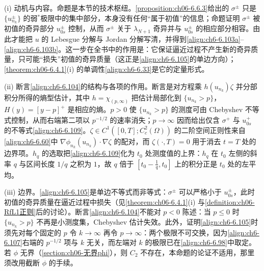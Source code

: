 \documentclass[../../main.tex]{subfiles}%
\begin{document}
\begin{remark}\label{remark:ch06-6.6.5}
(i) 动机与内容。命题是本节的技术枢纽。\cref{proposition:ch06-6.6.3}给出的 $\sigma^\pm$ 只是 $\{u^\pm_{n_k}\}$ 的弱$^*$极限中的集中部分，本身没有任何“属于初值”的信息；命题证明 $\sigma^\pm$ 被初值的奇异部分 $u^\pm_{0s}$ 控制，从而 $\sigma^\pm$ 关于 $\lambda_{N+1}$ 奇异并与 $u^\pm_{0s}$ 的相应部分相容。由此才能把 $u$ 的 Lebesgue 分解与 Jordan 分解写清，并得到\eqref{align:ch6-6.103a}--\eqref{align:ch6-6.103b}。这一步在全书中的作用是：它保证逼近过程不产生新的奇异质量，只可能“损失”初值的奇异质量（这正是\eqref{align:ch6-6.105}的单边方向）；\cref{theorem:ch06-6.4.1}(i) 的单调性\eqref{align:ch6-6.33}是它的定量形式。

(ii) 断言\eqref{align:ch6-6.104}的结构与各项的作用。断言是对方程乘 $h(u_{n_k})\zeta$ 并分部积分所得的熵型估计，其中 $h=\chi_{(p,\infty)}$ 把估计局部化到 $\{u_{n_k}>p\}$，$H(y)=[y-p]^+$ 是相应的熵。$p>0$ 使 $\{u_{n_k}>p\}$ 的测度可由 Chebyshev 不等式控制，从而右端第二项以 $p^{-1/2}$ 的速率消失；$p\to\infty$ 因而给出仅含 $\sigma^+$ 与 $u^+_{0s}$ 的不等式\eqref{align:ch6-6.109}。$\zeta\in C^1([0,T];C^2_c(\Omega))$ 的二阶空间正则性来自\eqref{align:ch6-6.60}中 $\nabla\phi_{n_k}(u_{n_k})\cdot\nabla\zeta$ 的配对，而 $\zeta(\cdot,T)=0$ 用于消去 $t=T$ 处的边界项。$h_q$ 的选取把\eqref{align:ch6-6.109}化为 $t_0$ 处测度值的上界：$h_q$ 在 $t_0$ 左侧的斜率 $q$ 与区间长度 $1/q$ 之积为 $1$，故 $q$ 倍于 $[t_0-\frac{1}{q},t_0]$ 上的积分正是 $t_0$ 处的左平均。

(iii) 边界。\eqref{align:ch6-6.105}是单边不等式而非等式：$\sigma^\pm$ 可以严格小于 $u^\pm_{0s}$，此时初值的奇异质量在逼近过程中损失（见\cref{theorem:ch06-6.4.1}(i) 与\cref{definition:ch06-RfL1正则}后的讨论）。断言\eqref{align:ch6-6.104}不能对 $p<0$ 陈述：当 $p\leqslant0$ 时 $\{u_{n_k}>p\}$ 不再是小测度集，Chebyshev 估计失效。此外，证明\eqref{align:ch6-6.105}时须先对每个固定的 $p$ 令 $k\to\infty$ 再令 $p\to\infty$：两个极限不可交换，因为\eqref{align:ch6-6.107}右端的 $p^{-1/2}$ 项与 $k$ 无关，而左端对 $k$ 的极限已在\eqref{align:ch6-6.98}中取定。若 $\phi$ 无界（\cref{section:ch06-无界phi}），则 $C_2$ 不存在，本命题的论证不适用，那里须改用截断 $\phi$ 的手续。
\end{remark}
\end{document}
